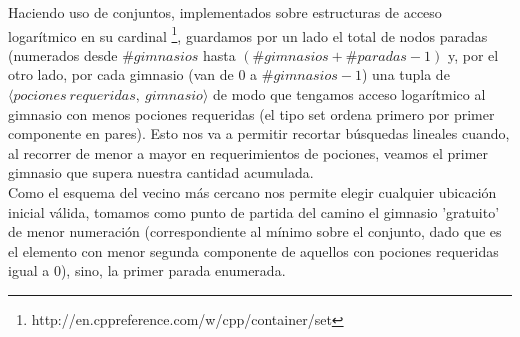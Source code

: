     Haciendo uso de conjuntos, implementados sobre estructuras de acceso logarítmico en su cardinal \footnote{http://en.cppreference.com/w/cpp/container/set}, guardamos por un lado el total de nodos paradas (numerados desde $\#gimnasios$ hasta $(\#gimnasios + \#paradas - 1)$ y, por el otro lado, por cada gimnasio (van de 0 a $\#gimnasios-1$) una tupla de $\langle pociones\ requeridas,\ gimnasio \rangle$ de modo que tengamos acceso logarítmico al gimnasio con menos pociones requeridas (el tipo set ordena primero por primer componente en pares). Esto nos va a permitir recortar búsquedas lineales cuando, al recorrer de menor a mayor en requerimientos de pociones, veamos el primer gimnasio que supera nuestra cantidad acumulada.
    \\

    Como el esquema del vecino más cercano nos permite elegir cualquier ubicación inicial válida, tomamos como punto de partida del camino el gimnasio 'gratuito' de menor numeración (correspondiente al mínimo sobre el conjunto, dado que es el elemento con menor segunda componente de aquellos con pociones requeridas igual a 0), sino, la primer parada enumerada.
